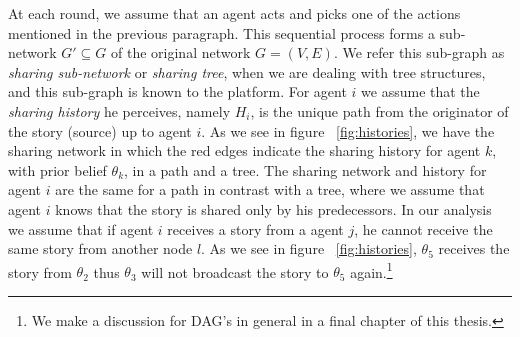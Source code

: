 At each round, we assume that an agent acts and picks one of the actions mentioned in the previous paragraph. This sequential process forms a sub-network $G' \subseteq G$ of the original network $G=(V,E)$. We refer this sub-graph as \textit{sharing sub-network} or \textit{sharing tree}, when we are dealing with tree structures, and this sub-graph is known to the platform. For agent $i$ we assume that the \textit{sharing history} he perceives, namely $H_i$, is the unique path from the originator of the story (source) up to agent $i$. As we see in figure ~\ref{fig:histories}, we have the sharing network in which the red edges indicate the sharing history for agent $k$, with prior belief $\theta_k$, in a path and a tree. The sharing network and history for agent $i$ are the same for a path in contrast with a tree, where we assume that agent $i$ knows that the story is shared only by his predecessors. In our analysis we assume that if agent $i$ receives a story from a agent $j$, he cannot receive the same story from another node $l$. As we see in figure ~\ref{fig:histories}, $\theta_5$ receives the story from $\theta_2$ thus $\theta_3$ will not broadcast the story to $\theta_5 $ again.\footnote{We make a discussion for DAG's in general in a final chapter of this thesis.}

